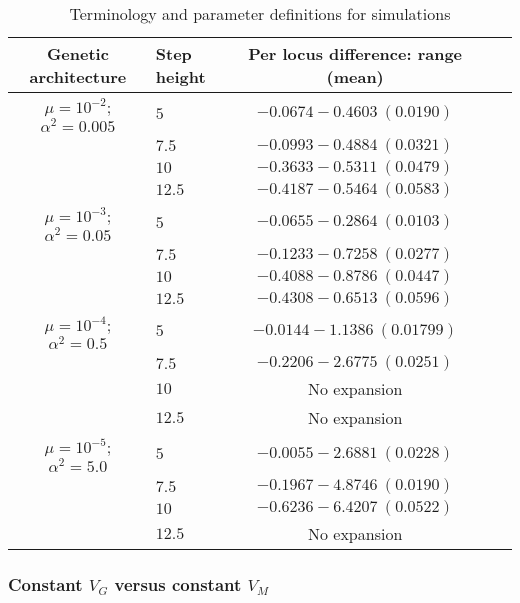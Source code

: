 \begin{table}[h]
\centering \footnotesize
\caption{Terminology and parameter definitions for simulations}
\label{tab:effects}
\begin{tabular}{cp{}cp{}c}
Genetic architecture				&	Step height	&	Per locus difference: range (mean)  \\ \hline \hline
$\mu = 10^{-2}$; $\alpha^2 = 0.005$	& $5$	& $-0.0674 - 0.4603 ~ (0.0190)$	\\ 
							& $7.5$	& $-0.0993 - 0.4884 ~ (0.0321)$	\\ 
							& $10$	& $-0.3633 - 0.5311 ~ (0.0479)$	\\ 
							& $12.5$	& $-0.4187 - 0.5464 ~ (0.0583)$	\\ \hline
$\mu = 10^{-3}$; $\alpha^2 = 0.05$	& $5$	& $-0.0655 - 0.2864 ~ (0.0103)$	\\ 
							& $7.5$	& $-0.1233 - 0.7258 ~ (0.0277)$	\\ 
							& $10$	& $-0.4088 - 0.8786 ~ (0.0447)$	\\ 
							& $12.5$	& $-0.4308 - 0.6513 ~ (0.0596)$	\\ \hline
$\mu = 10^{-4}$; $\alpha^2 = 0.5$	& $5$	& $-0.0144 - 1.1386 ~ (0.01799)$	\\ 
							& $7.5$	& $-0.2206 - 2.6775 ~ (0.0251)$	\\ 
							& $10$	& No expansion	\\ 
							& $12.5$	& No expansion	\\ \hline
$\mu = 10^{-5}$; $\alpha^2 = 5.0$	& $5$	& ${-0.0055} - 2.6881 ~ (0.0228)$	\\ 
							& $7.5$	& $-0.1967 - 4.8746 ~ (0.0190)$	\\ 
							& $10$	& $-0.6236 - 6.4207 ~ (0.0522)$	\\ 
							& $12.5$	& No expansion	\\ \hline
\end{tabular}
\end{table}

\subsubsection{Constant $V_G$ versus constant $V_M$}

